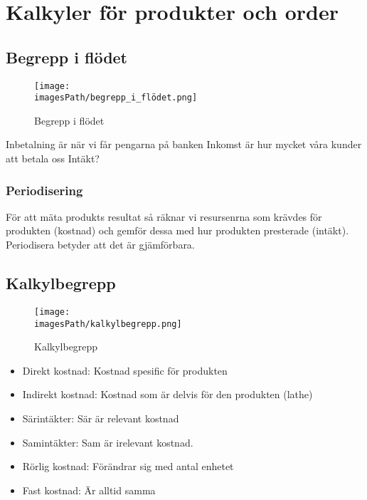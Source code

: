 %
%
%
%

\section{Kalkyler för produkter och order}
\subsection{Begrepp i flödet}
\begin{figure}[!h]
    \centering
    \texttt{[image: \\imagesPath/begrepp\_i\_flödet.png]}
    \caption{Begrepp i flödet}
\end{figure}

Inbetalning är när vi får pengarna på banken 
Inkomst är hur mycket våra kunder att betala oss 
Intäkt?

\subsubsection{Periodisering}
För att mäta produkts resultat så räknar vi resursenrna som krävdes för produkten 
(kostnad) och gemför dessa med hur produkten presterade (intäkt).
Periodisera betyder att det är gjämförbara. 

\subsection{Kalkylbegrepp}
\begin{figure}[!h]
    \centering
    \texttt{[image: \\imagesPath/kalkylbegrepp.png]}
    \caption{Kalkylbegrepp}
\end{figure}
\begin{itemize}
    \item Direkt kostnad: Kostnad spesific för produkten
    \item Indirekt kostnad: Kostnad som är delvis för den produkten (lathe)
    \item Särintäkter: Sär är relevant kostnad 
    \item Samintäkter: Sam är irelevant kostnad.  
    \item Rörlig kostnad: Förändrar sig med antal enhetet
    \item Fast kostnad: Är alltid samma
\end{itemize}


